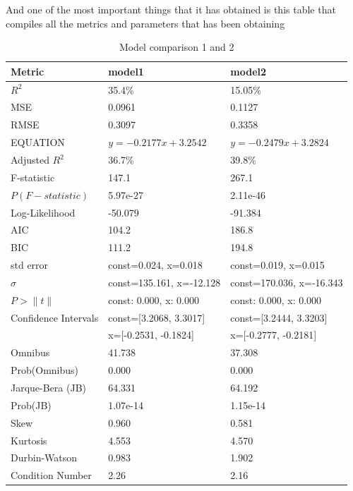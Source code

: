 \documentclass{article}
\begin{document}
And one of the most important things that it has obtained is this table that compiles all the metrics and parameters that has been obtaining
\begin{table}[h]
  \small 
  \setlength{\extrarowheight}{-2pt} 
  \begin{tabular}{|l|l|l|}
  \hline
  \textbf{Metric} & \textbf{model1} & \textbf{model2} \\
  \hline
  $R^2$ & 35.4\% & 15.05\% \\
  \hline
  MSE & 0.0961 & 0.1127 \\
  \hline
  RMSE & 0.3097 & 0.3358 \\
  \hline
  EQUATION & $y=-0.2177x+3.2542$ & $y=-0.2479x+3.2824$ \\
  \hline
  Adjusted $R^2$ & 36.7\% & 39.8\% \\
  \hline
  F-statistic & 147.1 & 267.1 \\
  \hline
  $P(F-statistic)$ & 5.97e-27 & 2.11e-46 \\
  \hline
  Log-Likelihood & -50.079 & -91.384 \\
  \hline
  AIC & 104.2 & 186.8 \\
  \hline
  BIC & 111.2 & 194.8 \\
  \hline
  std error & const=0.024, x=0.018 & const=0.019, x=0.015 \\
  \hline
  $\sigma$ & const=135.161, x=-12.128 & const=170.036, x=-16.343 \\
  \hline
  $P>\|t\|$ & const: 0.000, x: 0.000 & const: 0.000, x: 0.000 \\
  \hline
  Confidence Intervals & const=[3.2068, 3.3017]  & const=[3.2444, 3.3203] \\
  & x=[-0.2531, -0.1824] &x=[-0.2777, -0.2181]\\
  \hline
  Omnibus & 41.738 & 37.308 \\
  \hline
  Prob(Omnibus) & 0.000 & 0.000 \\
  \hline
  Jarque-Bera (JB) & 64.331 & 64.192 \\
  \hline
  Prob(JB) & 1.07e-14 & 1.15e-14 \\
  \hline
  Skew & 0.960 & 0.581 \\
  \hline
  Kurtosis & 4.553 & 4.570 \\
  \hline
  Durbin-Watson & 0.983 & 1.902 \\
  \hline
  Condition Number & 2.26 & 2.16 \\
  \hline
  \end{tabular}
  \caption{Model comparison 1 and 2}
  \label{tab:modelos12}
  \end{table}
\end{document}
